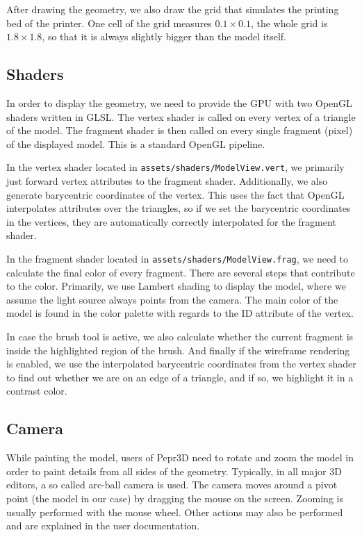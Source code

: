 After drawing the geometry, we also draw the grid that simulates the printing bed of the printer.
One cell of the grid measures $0.1\times{}0.1$, the whole grid is $1.8\times{}1.8$, so that it is always slightly bigger than the model itself.

\subsection{Shaders}

In order to display the geometry, we need to provide the GPU with two OpenGL shaders written in GLSL.
The vertex shader is called on every vertex of a triangle of the model.
The fragment shader is then called on every single fragment (pixel) of the displayed model.
This is a standard OpenGL pipeline.

In the vertex shader located in \texttt{assets/shaders/ModelView.vert}, we primarily just forward vertex attributes to the fragment shader.
Additionally, we also generate barycentric coordinates of the vertex.
This uses the fact that OpenGL interpolates attributes over the triangles, so if we set the barycentric coordinates in the vertices, they are automatically correctly interpolated for the fragment shader.

In the fragment shader located in \texttt{assets/shaders/ModelView.frag}, we need to calculate the final color of every fragment.
There are several steps that contribute to the color.
Primarily, we use Lambert shading to display the model, where we assume the light source always points from the camera.
The main color of the model is found in the color palette with regards to the ID attribute of the vertex.

In case the brush tool is active, we also calculate whether the current fragment is inside the highlighted region of the brush.
And finally if the wireframe rendering is enabled, we use the interpolated barycentric coordinates from the vertex shader to find out whether we are on an edge of a triangle, and if so, we highlight it in a contrast color.

\subsection{Camera}

While painting the model, users of Pepr3D need to rotate and zoom the model in order to paint details from all sides of the geometry.
Typically, in all major 3D editors, a so called arc-ball camera is used.
The camera moves around a pivot point (the model in our case) by dragging the mouse on the screen.
Zooming is usually performed with the mouse wheel.
Other actions may also be performed and are explained in the user documentation.

